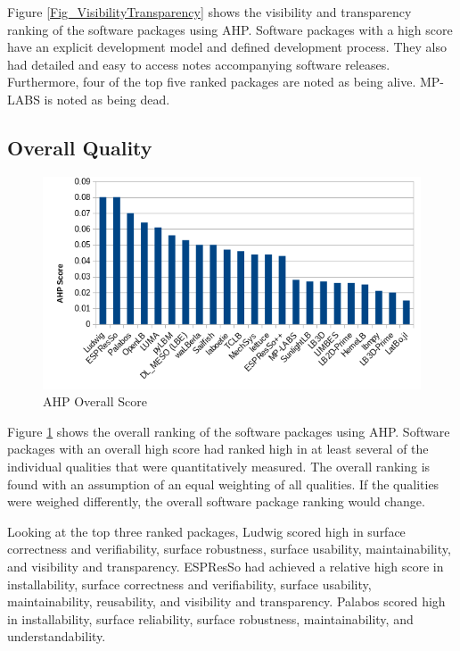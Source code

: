 \documentclass[12pt, notitlepage]{article}
\begin{document}
Figure \ref{Fig_VisibilityTransparency} shows the visibility and transparency ranking of the software packages using AHP. Software packages with a high score have an explicit development model and defined development process. They also 
had detailed and easy to access notes accompanying software releases. Furthermore, four of the top five ranked packages are noted as being alive. MP-LABS is noted as being dead.

\subsection{Overall Quality}

\begin{figure}[h!]
	\begin{center}
		\includegraphics[width=1.0\textwidth]{finalscore_chart}
		\caption{AHP Overall Score}
		\label{Fig_OverallScore}
	\end{center}
\end{figure}

Figure \ref{Fig_OverallScore} shows the overall ranking of the software packages using AHP. Software packages with an overall high score had ranked high in at least several of the individual qualities that were quantitatively measured. The overall ranking is found with an assumption of an equal weighting of all qualities. If the qualities were weighed differently, the overall software package ranking would change.

Looking at the top three ranked packages, Ludwig scored high in surface correctness and verifiability, surface robustness, surface usability, maintainability, and visibility and transparency. ESPResSo had achieved a relative high score in installability, surface correctness and verifiability, surface usability, maintainability, reusability, and visibility and transparency. Palabos scored high in installability, surface reliability, surface robustness, maintainability, and understandability. 
\end{document}
